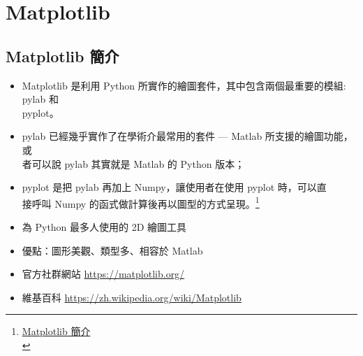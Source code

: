 \documentclass[a4paper,12pt]{article}
\begin{document}
\section{Matplotlib}
\label{sec:orgc25aa14}
\subsection{Matplotlib 簡介}
\label{sec:org51066fc}
\begin{itemize}
\item Matplotlib 是利用 Python 所實作的繪圖套件，其中包含兩個最重要的模組: pylab 和\\
pyplot。\\
\item pylab 已經幾乎實作了在學術介最常用的套件 — Matlab 所支援的繪圖功能，或\\
者可以說 pylab 其實就是 Matlab 的 Python 版本；\\
\item pyplot 是把 pylab 再加上 Numpy，讓使用者在使用 pyplot 時，可以直\\
接呼叫 Numpy 的函式做計算後再以圖型的方式呈現。\footnote{\href{https://medium.com/@jemmy1234/matplotlib-\%E7\%B0\%A1\%E4\%BB\%8B-857323964e2d}{Matplotlib 簡介}\\}\\
\item 為 Python 最多人使用的 2D 繪圖工具\\
\item 優點：圖形美觀、類型多、相容於 Matlab\\
\item 官方社群網站 \url{https://matplotlib.org/}\\
\item 維基百科 \url{https://zh.wikipedia.org/wiki/Matplotlib}\\
\end{itemize}
\end{document}
